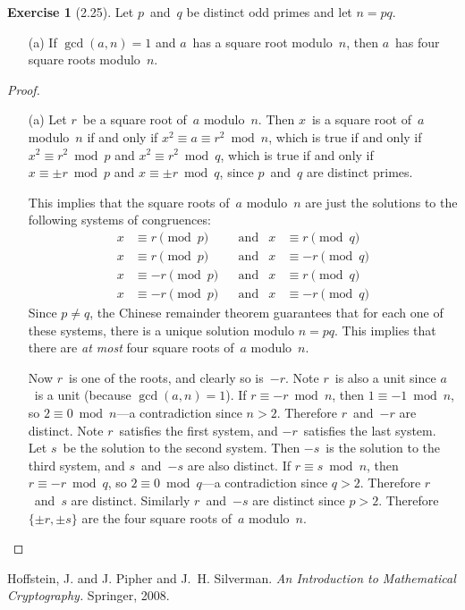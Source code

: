 \documentclass[letterpaper,12pt]{article}
\theoremstyle{definition}
\newtheorem*{exer}{Exercise}
\begin{document}
\begin{exer}[2.25]
Let \(p\)~and~\(q\) be distinct odd primes and let \(n=pq\).
\begin{enumerate}[itemsep=0pt]
\item[(a)] If \(\gcd(a,n)=1\) and \(a\)~has a square root modulo~\(n\), then \(a\)~has four square roots modulo~\(n\).
\end{enumerate}
\end{exer}
\begin{proof}
\begin{enumerate}[itemsep=0pt]
\item[(a)] Let \(r\)~be a square root of~\(a\) modulo~\(n\). Then \(x\)~is a square root of~\(a\) modulo~\(n\) if and only if \(x^2\equiv a\equiv r^2\bmod n\), which is true if and only if \(x^2\equiv r^2\bmod p\) and \(x^2\equiv r^2\bmod q\), which is true if and only if \(x\equiv\pm r\bmod p\) and \(x\equiv\pm r\bmod q\), since \(p\)~and~\(q\) are distinct primes.

This implies that the square roots of~\(a\) modulo~\(n\) are just the solutions to the following systems of congruences:
\begin{align}
x&\equiv r\pmod p&&\text{and}&x&\equiv r\pmod q\\
x&\equiv r\pmod p&&\text{and}&x&\equiv -r\pmod q\\
x&\equiv -r\pmod p&&\text{and}&x&\equiv r\pmod q\\
x&\equiv -r\pmod p&&\text{and}&x&\equiv -r\pmod q
\end{align}
Since \(p\ne q\), the Chinese remainder theorem guarantees that for each one of these systems, there is a unique solution modulo \(n=pq\). This implies that there are \emph{at most} four square roots of~\(a\) modulo~\(n\).

Now \(r\)~is one of the roots, and clearly so is~\(-r\). Note \(r\)~is also a unit since \(a\)~is a unit (because \(\gcd(a,n)=1\)). If \(r\equiv -r\bmod n\), then \(1\equiv -1\bmod n\), so \(2\equiv 0\bmod n\)---a contradiction since \(n>2\). Therefore \(r\)~and~\(-r\) are distinct. Note \(r\)~satisfies the first system, and \(-r\)~satisfies the last system. Let \(s\)~be the solution to the second system. Then \(-s\)~is the solution to the third system, and \(s\)~and~\(-s\) are also distinct. If \(r\equiv s\bmod n\), then \(r\equiv -r\bmod q\), so \(2\equiv 0\bmod q\)---a contradiction since \(q>2\). Therefore \(r\)~and~\(s\) are distinct. Similarly \(r\)~and~\(-s\) are distinct since \(p>2\). Therefore \(\{\pm r,\pm s\}\) are the four square roots of~\(a\) modulo~\(n\).\qedhere
\end{enumerate}
\end{proof}

\begin{thebibliography}{0}
 Hoffstein, J. and J. Pipher and J.~H. Silverman. \textit{An Introduction to Mathematical Cryptography.} Springer, 2008.
\end{thebibliography}
\end{document}
